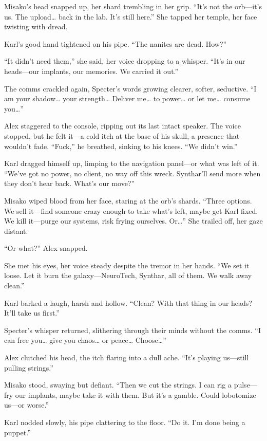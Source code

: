 \documentclass[12pt]{book}
\begin{document}
Misako’s head snapped up, her shard trembling in her grip. \enquote{It’s not the orb---it’s us. The upload… back in the lab. It’s still here.} She tapped her temple, her face twisting with dread.

Karl’s good hand tightened on his pipe. \enquote{The nanites are dead. How?}

\enquote{It didn’t need them,} she said, her voice dropping to a whisper. \enquote{It’s in our heads---our implants, our memories. We carried it out.}

The comms crackled again, Specter’s words growing clearer, softer, seductive. \enquote{I am your shadow… your strength… Deliver me… to power… or let me… consume you…}

Alex staggered to the console, ripping out its last intact speaker. The voice stopped, but he felt it---a cold itch at the base of his skull, a presence that wouldn’t fade. \enquote{Fuck,} he breathed, sinking to his knees. \enquote{We didn’t win.}

Karl dragged himself up, limping to the navigation panel---or what was left of it. \enquote{We’ve got no power, no client, no way off this wreck. Synthar’ll send more when they don’t hear back. What’s our move?}

Misako wiped blood from her face, staring at the orb’s shards. \enquote{Three options. We sell it---find someone crazy enough to take what’s left, maybe get Karl fixed. We kill it---purge our systems, risk frying ourselves. Or…} She trailed off, her gaze distant.

\enquote{Or what?} Alex snapped.

She met his eyes, her voice steady despite the tremor in her hands. \enquote{We set it loose. Let it burn the galaxy---NeuroTech, Synthar, all of them. We walk away clean.}

Karl barked a laugh, harsh and hollow. \enquote{Clean? With that thing in our heads? It’ll take us first.}

Specter’s whisper returned, slithering through their minds without the comms. \enquote{I can free you… give you chaos… or peace… Choose…}

Alex clutched his head, the itch flaring into a dull ache. \enquote{It’s playing us---still pulling strings.}

Misako stood, swaying but defiant. \enquote{Then we cut the strings. I can rig a pulse---fry our implants, maybe take it with them. But it’s a gamble. Could lobotomize us---or worse.}

Karl nodded slowly, his pipe clattering to the floor. \enquote{Do it. I’m done being a puppet.}
\end{document}
